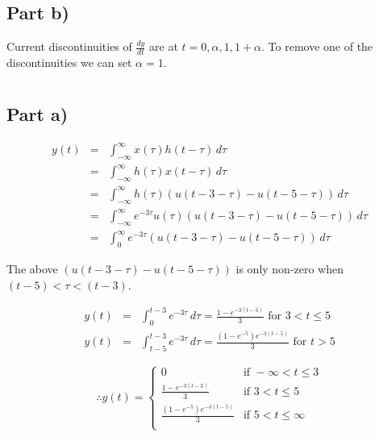 \documentclass[20pt]{article}
\begin{document}
\subsection*{Part b)}

Current discontinuities of $ \frac{dy}{d t} $ are at $ t = 0, \alpha, 1, 1 + \alpha $. To remove one of the discontinuities we can set $ \alpha = 1 $.

\section{}

\subsection*{Part a)}

\begin{eqnarray}
    y(t) &=& \int_{-\infty}^{\infty} x(\tau) h(t-\tau)  \,d\tau \\
    &=& \int_{-\infty}^{\infty} h(\tau) x(t-\tau)  \,d\tau \\
    &=& \int_{-\infty}^{\infty} h(\tau) (u(t-3-\tau) - u(t-5-\tau)) \,d\tau \\
    &=& \int_{-\infty}^{\infty} e^{-3\tau} u(\tau) (u(t-3-\tau) - u(t-5-\tau)) \,d\tau \\
    &=& \int_{0}^{\infty}  e^{-3\tau} (u(t-3-\tau) - u(t-5-\tau)) \,d\tau
\end{eqnarray}

The above $(u(t-3-\tau) - u(t-5-\tau))$ is only non-zero when $ (t-5) < \tau < (t-3) $.

\begin{eqnarray}
    y(t) &=& \int_{0}^{t-3}  e^{-3\tau} \,d\tau = \frac{1-e^{-3(t-3)}}{3}  \text{ for } 3 < t \leq 5 \\
    y(t) &=& \int_{t-5}^{t-3}  e^{-3\tau} \,d\tau = \frac{(1-e^{-5})e^{-3(t-5)}}{3}  \text{ for } t > 5
\end{eqnarray}

\begin{equation}
    \therefore y(t)=
    \begin{cases}
        0                               & \text{if } -\infty < t \leq 3 \\
        \frac{1-e^{-3(t-3)}}{3}         & \text{if } 3 < t \leq 5       \\
        \frac{(1-e^{-5})e^{-3(t-5)}}{3} & \text{if } 5 < t \leq \infty  \\
    \end{cases}
\end{equation}
\end{document}

